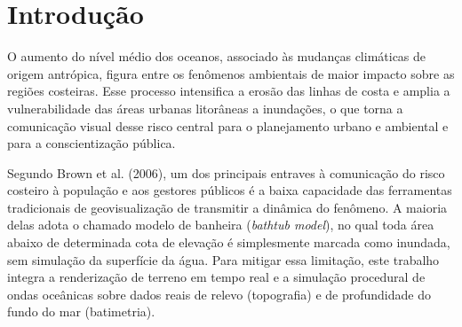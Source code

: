 \documentclass[conference]{IEEEtran}
\begin{document}
\begin{abstract}
\textit{Abstract}---This paper presents an interactive scientific
visualization system for analyzing coastal erosion and sea level rise
scenarios, built on a real Digital Elevation Model (DEM) of the Baixada
Santista region (Brazil).  The goal was to determine
experimentally the geometric load beyond which the adaptive level of detail
technique CDLOD (Continuous Distance-Dependent Level of Detail) becomes
indispensable to keep the application interactive, considering mobile
devices as the final target audience. The ocean surface was modeled with
six Gerstner waves, with a base height adjustable in real time, which
allows sea level rise scenarios of 0, +0.5, +1 and +2 meters to be
visualized. An automated windowless benchmark, run on an NVIDIA RTX 3060
graphics processing unit (GPU), compared rendering with and without level
of detail at five terrain resolutions. The results indicate a tipping point near 4 million triangles (2.7 to 4.3 million, depending on the criterion and the run), beyond which CDLOD becomes faster than the full mesh. Frustum culling cut frame time by 22\% and moved the tipping point to about 2.3 million. It is concluded that adaptive level of detail is what
makes real-time three-dimensional visualization of coastal flooding
feasible.

Keywords: Scientific visualization. Level of detail. Terrain rendering.
Ocean simulation. Sea level rise.
\end{abstract}

\section{Introdução}
\label{sec:intro}

O aumento do nível médio dos oceanos, associado às mudanças climáticas de
origem antrópica, figura entre os fenômenos ambientais de maior impacto
sobre as regiões costeiras. Esse processo intensifica a erosão das linhas de costa e amplia a vulnerabilidade das áreas urbanas litorâneas a inundações, o que torna a comunicação visual desse risco central para o planejamento urbano e ambiental e para a conscientização pública.

Segundo Brown et al. (2006), um dos principais entraves à comunicação do
risco costeiro à população e aos gestores públicos é a baixa capacidade
das ferramentas tradicionais de geovisualização de transmitir a dinâmica
do fenômeno. A maioria delas adota o chamado modelo de banheira
(\emph{bathtub model}), no qual toda área abaixo de determinada cota de
elevação é simplesmente marcada como inundada, sem simulação da
superfície da água. Para mitigar essa limitação, este trabalho integra a
renderização de terreno em tempo real e a simulação procedural de ondas
oceânicas sobre dados reais de relevo (topografia) e de profundidade do
fundo do mar (batimetria).
\end{document}
